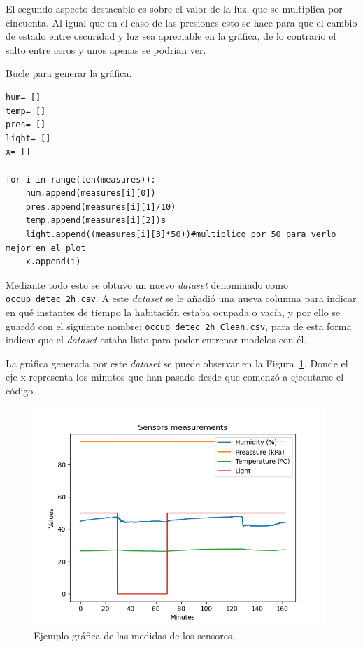 \documentclass[a4paper, 12pt]{book}
\begin{document}
El segundo aspecto destacable es sobre el valor de la luz, que se multiplica por cincuenta. Al igual que en el caso de las presiones esto se hace para que el cambio de estado entre oscuridad y luz sea apreciable en la gráfica, de lo contrario el salto entre ceros y unos apenas se podrían ver.

\begin{listing}[htb]
    \caption{Bucle para generar la gráfica.}{}
    \label{lst:secondloop_read_sensor}
    \begin{verbatim}
hum= []
temp= []
pres= []
light= []
x= []

for i in range(len(measures)):
    hum.append(measures[i][0])
    pres.append(measures[i][1]/10)
    temp.append(measures[i][2])s
    light.append((measures[i][3]*50))#multiplico por 50 para verlo mejor en el plot
    x.append(i)
    \end{verbatim}
\end{listing}

Mediante todo esto se obtuvo un nuevo \textit{dataset} denominado como \texttt{occup\_detec\_2h.csv}. A este \textit{dataset} se le añadió una nueva columna para indicar en qué instantes de tiempo la habitación estaba ocupada o vacía, y por ello se guardó con el siguiente nombre: \texttt{occup\_detec\_2h\_Clean.csv}, para de esta forma indicar que el \textit{dataset} estaba listo para poder entrenar modelos con él.

La gráfica generada por este \textit{dataset} se puede observar en la Figura~\ref{fig:ejemplo_gráfica}. Donde el eje x representa los minutos que han pasado desde que comenzó a ejecutarse el código.

\begin{figure}[htb]
  \centering
  \includegraphics[width=11cm, keepaspectratio]{img/Data_occup_detec_2h_original.png}
  \caption{Ejemplo gráfica de las medidas de los sensores.}\label{fig:ejemplo_gráfica}
\end{figure}
\end{document}
